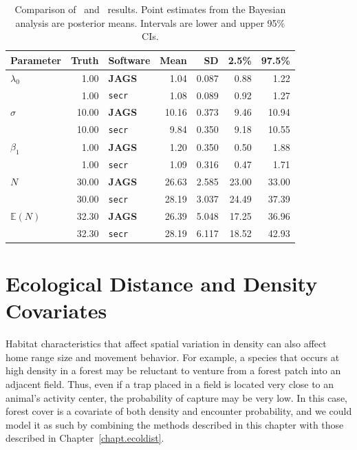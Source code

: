 \begin{table}%
\centering
\caption{Comparison of \secr~and \jags~results. Point estimates from
  the Bayesian analysis are posterior means. Intervals are lower and
  upper 95\% CIs.}
\begin{tabular}{lrlrrrr}
\hline
Parameter 	& Truth 	& Software 	& Mean 	& SD 	& 2.5\% & 97.5\% \\
\hline
 $\lambda_0$ 	&  1.00 	& \textbf{JAGS} 	&  1.04 	& 0.087 	&  0.88 	&  1.22 \\
                &  1.00 	& \texttt{secr} 	&  1.08 	& 0.089 	&  0.92 	&  1.27 \\
 $\sigma$ 	& 10.00 	& \textbf{JAGS} 	& 10.16 	& 0.373 	&  9.46 	& 10.94 \\
  	        & 10.00 	& \texttt{secr} 	&  9.84 	& 0.350 	&  9.18 	& 10.55 \\
 $\beta_1$ 	&  1.00 	& \textbf{JAGS} 	&  1.20 	& 0.350 	&  0.50 	&  1.88 \\
  	        &  1.00 	& \texttt{secr} 	&  1.09 	& 0.316 	&  0.47 	&  1.71 \\
 $N$ 	        & 30.00 	& \textbf{JAGS} 	& 26.63 	& 2.585 	& 23.00 	& 33.00 \\
  	        & 30.00 	& \texttt{secr} 	& 28.19 	& 3.037 	& 24.49 	& 37.39 \\
 $\mathbb{E}(N)$ 	& 32.30 	& \textbf{JAGS} 	& 26.39 	& 5.048 	& 17.25 	& 36.96 \\
  	        & 32.30 	& \texttt{secr} 	& 28.19 	& 6.117 	& 18.52 	& 42.93 \\
\hline
\end{tabular}
\label{state-space.tab.jagsVsecr}
\end{table}


\section{Ecological Distance and Density Covariates}

Habitat characteristics that affect spatial variation in density can
also affect home range size and movement behavior. For example, a
species that occurs at high density in a forest may be reluctant to
venture from a forest patch into an adjacent field. Thus, even if a
trap placed in a field is located very close to an animal's activity
center, the probability of capture may be very
low. In this case, forest cover is a covariate of
both density and encounter probability,
and we could model it as such by combining the methods described in
this chapter with those described in Chapter~\ref{chapt.ecoldist}.


